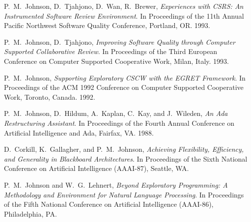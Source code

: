 \begin{Conference Publications}
\item P.~M.~Johnson, D.~Tjahjono, D.~Wan, R.~Brewer, {\em Experiences
  with CSRS: An Instrumented Software Review Environment}.  In Proceedings
  of the 11th Annual Pacific Northwest Software Quality Conference,
  Portland, OR. 1993.
  
\item P.~M.~Johnson, D.~Tjahjono, {\em Improving Software Quality through
  Computer Supported Collaborative Review}.  In Proceedings of the Third
  European Conference on Computer Supported Cooperative Work, Milan, Italy.
  1993.
  
\item P.~M.~Johnson, {\em Supporting Exploratory CSCW with the EGRET
  Framework}. In Proceedings of the ACM 1992 Conference on Computer
  Supported Cooperative Work, Toronto, Canada. 1992.

\item P.~M.~Johnson, D.~Hildum, A.~Kaplan, C.~Kay, and J.~Wileden,
  {\em An Ada Restructuring Assistant}.  In Proceedings of the
  Fourth Annual Conference on Artificial Intelligence and Ada,
  Fairfax, VA. 1988.

\item D.~Corkill, K.~Gallagher, and P.~M.~Johnson, {\em Achieving
  Flexibility, Efficiency, and Generality in Blackboard Architectures}. 
  In Proceedings of the Sixth National Conference on
  Artificial Intelligence (AAAI-87), Seattle, WA.

\item P.~M.~Johnson and W.~G.~Lehnert, {\em Beyond Exploratory Programming:
  A Methodology and Environment for Natural Language Processing}. In
  Proceedings of the Fifth National Conference on
  Artificial Intelligence (AAAI-86), Philadelphia, PA.

\end{Conference Publications}  


